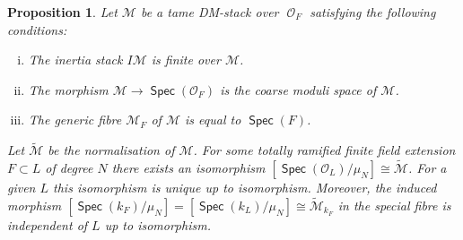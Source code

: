 \documentclass{article}
\DeclareMathOperator{\Spec}{\mathsf{Spec}}
\DeclareMathOperator{\Oo}{\mathcal{O}}
\newcommand{\CM}{{\mathcal M}}
\newcommand{\CO}{{\mathcal O}}
\theoremstyle{definition}
\theoremstyle{plain}
\newtheorem{proposition}[definition]{Proposition}
\begin{document}
\begin{proposition} \label{CMIso}
  Let $\CM$ be a tame DM-stack over $\Oo_F$ satisfying the following conditions:
  \begin{enumerate}[(i)]
  \item The inertia stack $I \CM$ is finite over $\CM$.
  \item The morphism $\CM \to \Spec(\CO_F)$ is the coarse moduli space of $\CM$.
  \item The generic fibre $\CM_F$ of $\CM$ is equal to $\Spec(F)$.
  \end{enumerate}
Let $\widetilde \CM$ be the normalisation of $\CM$. For some totally ramified finite field extension $F \subset L$ of degree $N$ there exists an isomorphism $[\Spec(\CO_L)/\mu_N] \cong \widetilde\CM$. For a given $L$ this isomorphism is unique up to isomorphism. Moreover, the induced morphism $[\Spec(k_F)/\mu_N] = [\Spec(k_L)/\mu_N] \cong \widetilde \CM_{k_F}$ in the special fibre is independent of $L$ up to isomorphism.
\end{proposition}
\end{document}
